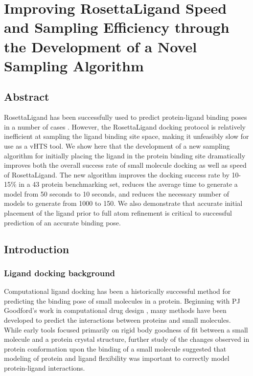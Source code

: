 \chapter{Improving RosettaLigand Speed and Sampling Efficiency through the Development of a Novel Sampling Algorithm}
\label{chap:lowres_paper}
\section{Abstract}

RosettaLigand has been successfully used to predict protein-ligand binding poses in a number of cases \citep{Turlington:2013et,Davis:2009fx,Combs:2013bl}.
However, the RosettaLigand docking protocol is relatively inefficient at sampling the ligand binding site space, making it unfeasibly slow for use as a \ac{vHTS} tool.
We show here that the development of a new sampling algorithm for initially placing the ligand in the protein binding site dramatically improves both the overall success rate of small molecule docking as well as speed of RosettaLigand.
The new algorithm improves the docking success rate by 10-15\% in a 43 protein benchmarking set, reduces the average time to generate a model from 50 seconds to 10 seconds, and reduces the necessary number of models to generate from 1000 to 150.
We also demonstrate that accurate initial placement of the ligand prior to full atom refinement is critical to successful prediction of an accurate binding pose.

\section{Introduction}

\subsection{Ligand docking background}

Computational ligand docking has been a historically successful method for predicting the binding pose of small molecules in a protein.
Beginning with PJ Goodford's work in computational drug design \citep{Goodford:1985bf}, many methods have been developed to predict the interactions between proteins and small molecules.
While early tools focused primarily on rigid body goodness of fit between a small molecule and a protein crystal structure, further study of the changes observed in protein conformation upon the binding of a small molecule \citep{Bystroff:1991tl} suggested that modeling of protein and ligand flexibility was important to correctly model protein-ligand interactions.

